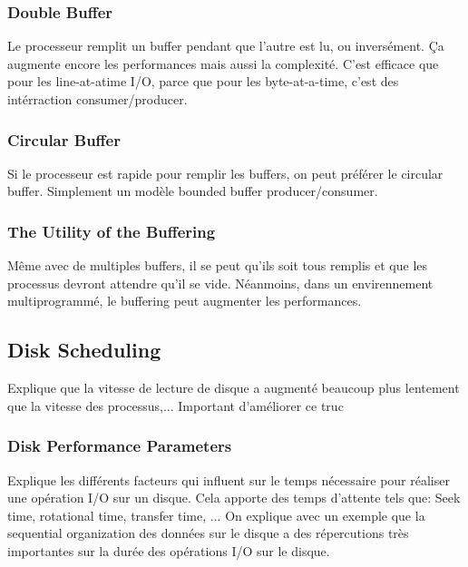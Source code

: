 \subsubsection{Double Buffer}
Le processeur remplit un buffer pendant que l'autre est lu, ou inversément.
Ça augmente encore les performances mais aussi la complexité.
C'est efficace que pour les line-at-atime I/O, parce que pour les byte-at-a-time, c'est des intérraction consumer/producer.

\subsubsection{Circular Buffer}
Si le processeur est rapide pour remplir les buffers, on peut préférer le circular buffer.
Simplement un modèle bounded buffer producer/consumer.

\subsubsection{The Utility of the Buffering}
Même avec de multiples buffers, il se peut qu'ils soit tous remplis et que les processus devront attendre qu'il se vide.
Néanmoins, dans un envirennement multiprogrammé, le buffering peut augmenter les performances.

\subsection{Disk Scheduling}
Explique que la vitesse de lecture de disque a augmenté beaucoup plus lentement que la vitesse des processus,...
Important d'améliorer ce truc

\subsubsection{Disk Performance Parameters}
Explique les différents facteurs qui influent sur le temps nécessaire pour réaliser une opération I/O sur un disque.
Cela apporte des temps d'attente tels que: Seek time, rotational time, transfer time, ...
On explique avec un exemple que la sequential organization des données sur le disque a des répercutions très importantes sur la durée des opérations I/O sur le disque.

